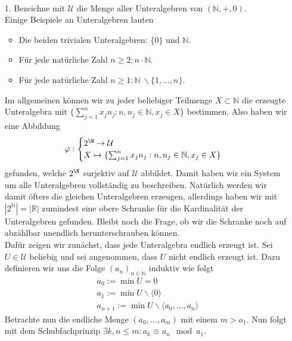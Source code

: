 \begin{solution}
\leavevmode \\
\begin{itemize}
  \item [1.] Bezeichne mit $\mathcal{U}$ die Menge aller Unteralgebren
  von $(\mathbb{N},+,0)$. \\
  Einige Beispiele an Unteralgebren lauten
  \begin{itemize}
    \item Die beiden trivialen Unteralgebren: $\{0\}$ und $\mathbb{N}$.
    \item Für jede natürliche Zahl $n \geq 2: n\cdot\mathbb{N}$.
    \item Für jede natürliche Zahl $n \geq 1: \mathbb{N}~\backslash\{1,\dots,n\}$.
  \end{itemize}
Im allgemeinen können wir zu jeder beliebiger Teilmenge $X \subset \mathbb{N}$
die erzeugte Unteralgebra mit $\{\sum_{j=1}^nx_jn_j: n, n_j \in \mathbb{N}, x_j \in X \}$
bestimmen. Also haben wir eine Abbildung
\begin{align*}
  \varphi: \begin{cases}
    2^\N \rightarrow \mathcal{U} \\
    X \mapsto \{\sum_{j=1}^nx_jn_j: n, n_j \in \mathbb{N}, x_j \in X \}
  \end{cases}
\end{align*}
gefunden, welche $2^\N$ surjektiv auf $\mathcal{U}$ abbildet.
Damit haben wir ein System um alle Unteralgebren vollständig zu beschreiben.
Natürlich werden wir damit öfters die gleichen Unteralgebren erzeugen,
allerdings haben wir mit $|2^{\mathbb{N}}| = |\mathbb{R}|$ zumindest eine obere
Schranke für die Kardinalität der Unteralgebren gefunden. Bleibt noch die Frage,
ob wir die Schranke noch auf abzählbar unendlich herunterschrauben können. \\
Dafür zeigen wir zunächst, dass jede Unteralgebra endlich erzeugt ist.
Sei $U \in \mathcal{U}$ beliebig und sei angenommen,
dass $U$ nicht endlich erzeugt ist.
Dazu definieren wir uns die Folge $(a_n)_{n \in \mathbb{N}}$ induktiv wie folgt
\begin{align*}
  a_0 := \min U = 0\\
  a_1 := \min U \backslash \langle 0 \rangle \\
a_{n+1} := \min U \backslash \langle a_0,\dots,a_n\rangle
\end{align*}
Betrachte nun die endliche Menge $(a_0,\dots,a_m)$ mit einem $m > a_1$.
Nun folgt mit dem Schubfachprinzip $\exists k,n \leq m: a_k \equiv a_n \mod a_1$.

\end{itemize}
\end{solution}

